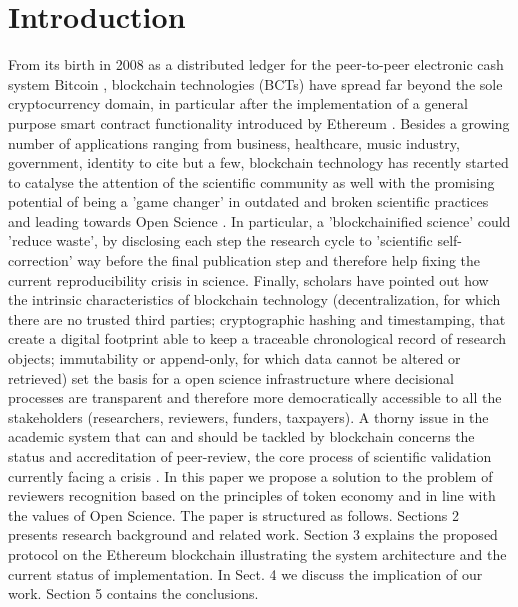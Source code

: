 \documentclass[runningheads]{llncs}
\begin{document}
\section{Introduction}
From its birth in 2008 as a distributed ledger for the peer-to-peer electronic cash system Bitcoin \cite{Bitcoin}, blockchain technologies (BCTs) have spread far beyond the sole cryptocurrency domain, in particular after the implementation of a general purpose smart contract functionality introduced by Ethereum \cite{Ethereum}.
Besides a growing number of applications ranging from business, healthcare, music industry, government, identity to cite but a few, blockchain technology has recently started to catalyse the attention of the scientific community as well \cite{Bitcoin-Nature-focus,vanRossum2017-DigSci} with the promising potential of being a 'game changer' in outdated and broken scientific practices and leading towards Open Science \cite{AES}. In particular, a 'blockchainified science'\cite{BlockchainforScience} could 'reduce waste'\cite{ReducingWaste-Lancet}, by disclosing each step the research cycle to 'scientific self-correction' way before the final publication step and therefore help fixing the current reproducibility crisis in science. Finally, scholars have pointed out how the intrinsic characteristics of blockchain technology (decentralization, for which there are no trusted third parties; cryptographic hashing and timestamping, that create a digital footprint able to keep a traceable chronological record of research objects; immutability or append-only, for which data cannot be altered or retrieved) set the basis for a open science infrastructure \cite{ReviewBlockchain2019} where decisional processes are transparent and therefore more democratically accessible to all the stakeholders (researchers, reviewers, funders, taxpayers).
\newline A thorny issue in the academic system that can and should be tackled by blockchain concerns the status and accreditation of peer-review, the core process of scientific validation currently facing a crisis \cite{Gropp-PeerRevStress}.
In this paper we propose a solution to the problem of reviewers recognition based on the principles of token economy and in line with the values of Open Science.
\newline The paper is structured as follows. Sections 2 presents research background and related work. Section 3 explains the proposed protocol on the Ethereum blockchain illustrating the system architecture and the current status of implementation. In Sect. 4 we discuss the implication of our work. Section 5 contains the conclusions.
\end{document}
